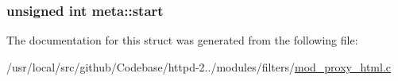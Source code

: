 \subsubsection[{\texorpdfstring{start}{start}}]{\setlength{\rightskip}{0pt plus 5cm}unsigned {\bf int} meta\+::start}\hypertarget{structmeta_a35fdd424f7223e4c37f8dbc0c3362252}{}\label{structmeta_a35fdd424f7223e4c37f8dbc0c3362252}


The documentation for this struct was generated from the following file\+:\begin{DoxyCompactItemize}
\item 
/usr/local/src/github/\+Codebase/httpd-\/2../modules/filters/\hyperlink{mod__proxy__html_8c}{mod\+\_\+proxy\+\_\+html.\+c}\end{DoxyCompactItemize}
